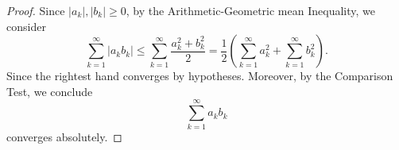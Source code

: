 \begin{Exercise}
\begin{proof}
Since $|a_k|, |b_k| \geq 0$, by the Arithmetic-Geometric mean Inequality, we consider
$$\sum_{k=1}^{\infty} |a_k b_k|
\leq \sum_{k=1}^{\infty} \frac{a_k^2+b_k^2}{2}
= \frac{1}{2}\left(\sum_{k=1}^{\infty} a_k^2 + \sum_{k=1}^{\infty} b_k^2 \right).$$
Since the rightest hand converges by hypotheses. Moreover, by the Comparison Test, we conclude $$\sum_{k=1}^{\infty}a_k b_k$$ converges absolutely.
\end{proof}
\end{Exercise}